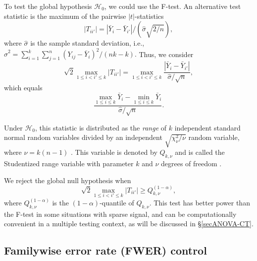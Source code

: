 \documentclass[11pt]{article}
\theoremstyle{plain}
\theoremstyle{definition}
\newcommand{\Hy}{\mathcal{H}}
\newcommand{\citp}{\citep}
\begin{document}
To test the global hypothesis $\Hy_0$, we could use the F-test.
An alternative test statistic is the  maximum of the pairwise $|t|$-statistics
$$|T_{ii'}|= |\bar{Y}_{i} - \bar{Y}_{i'}|/(\hat{\sigma}\sqrt{2/n}),$$
where $\hat{\sigma}$ is the sample standard deviation, i.e., 
$  \hat{\sigma}^2= \sum_{i=1}^k \sum_{j=1}^{n} (Y_{ij}-\bar{Y}_{i})^2/(nk-k).$
Thus, we consider
$$  \sqrt{2}\max_{1\leq i < i'\leq k} |T_{ii'}| = \max_{1\leq i < i'\leq k}\frac{|\bar{Y}_i-\bar{Y}_{i'}|}{\hat{\sigma}/\sqrt{n}},$$
which  equals
\begin{equation} \label{eqttTW}
\frac{\max_{1\leq i \leq k} \bar{Y}_i- \min_{1\leq i \leq k}\bar{Y}_{i}}{\hat{\sigma}/\sqrt{n}}.
\end{equation}


Under $\Hy_0$, this statistic is distributed as the \emph{range} of $k$ independent standard normal random variables divided by an independent $\sqrt{\chi^2_{\nu}/{\nu}}$ random variable, where $\nu=k(n-1)$ \citp[][p.31]{hochberg1987multiple}. This variable is denoted by $Q_{k,\nu}$ and is called the Studentized range variable with parameter $k$ and $\nu$ degrees of freedom \citp[for the CDF, see][p.376]{hochberg1987multiple}.

We reject the global null hypothesis when 
$$   \sqrt{2}\max_{1\leq i < i'\leq k} |T_{ii'}| \geq Q_{k,\nu}^{(1-\alpha)},$$
where $Q_{k,\nu}^{(1-\alpha)}$ is the $(1-\alpha)$-quantile of $Q_{k,\nu}$. This test has better power than the F-test in some situations with sparse signal, and can be computationally convenient in a multiple testing context, as will be discussed in \S\ref{secANOVA-CT}.















\subsection{Familywise error rate (FWER) control} \label{secdefFWER}
\end{document}
